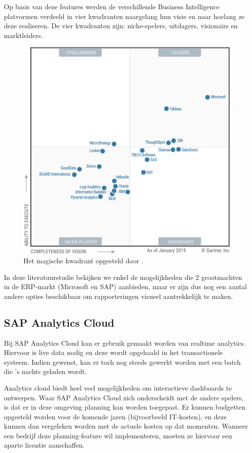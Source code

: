 Op basis van deze features werden de verschillende Business Intelligence platvormen verdeeld in vier kwadranten naargelang hun visie en naar hoelang ze deze realiseren. De vier kwadranten zijn: niche-spelers, uitdagers, visionairs en marktleiders.

\begin{figure}[h]
	\centering
	\includegraphics[scale=0.7]{../images/gartner.png}
	\caption{Het magische kwadrant opgesteld door \textcite{Gartner2019}.}
	\label{fig:dvmod}
\end{figure}

In deze literatuurstudie bekijken we enkel de mogelijkheden die 2 grootmachten in de ERP-markt (Microsoft en SAP) aanbieden, maar er zijn dus nog een aantal andere opties beschikbaar om rapporteringen visueel aantrekkelijk te maken. 

\subsection{SAP Analytics Cloud}
Bij SAP Analytics Cloud kan er gebruik gemaakt worden van realtime analytics. Hiervoor is live data nodig en deze wordt opgehaald in het transactionele systeem. Indien gewenst, kan er toch nog steeds gewerkt worden met een batch die 's nachts geladen wordt. 

Analytics cloud biedt heel veel mogelijkheden om interactieve dashboards te ontwerpen. Waar SAP Analytics Cloud zich onderscheidt met de andere spelers, is dat er in deze omgeving planning kan worden toegepast. Er kunnen budgetten opgesteld worden voor de komende jaren (bijvoorbeeld IT-kosten), en deze kunnen dan vergeleken worden met de actuele kosten op dat momenten. Wanneer een bedrijf deze planning-feature wil implementeren, moeten ze hiervoor een aparte licentie aanschaffen.

